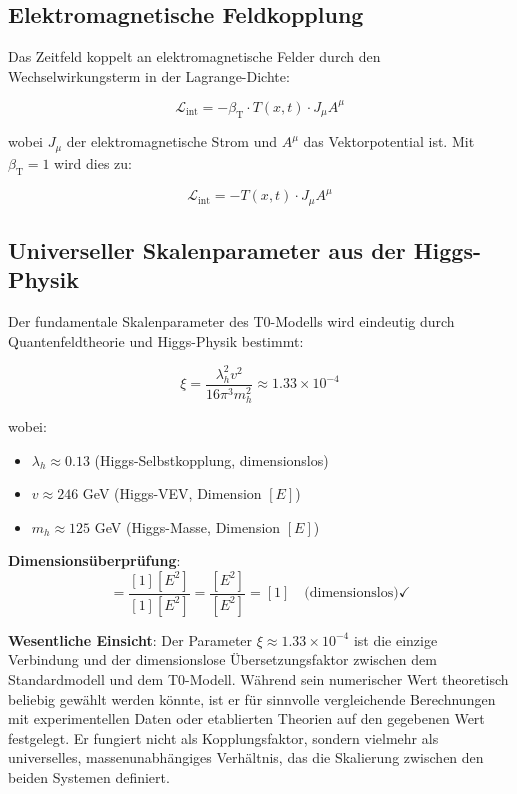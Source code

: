 \documentclass[12pt,a4paper]{article}
\newcommand{\Tfieldt}{T(x,t)}
\newcommand{\betaT}{\beta_{\text{T}}}
\newcommand{\xipar}{\xi}
\begin{document}
	\subsection{Elektromagnetische Feldkopplung}
	\label{subsec:em_coupling}
	
	Das Zeitfeld koppelt an elektromagnetische Felder durch den Wechselwirkungsterm in der Lagrange-Dichte:
	
	\begin{equation}
		\mathcal{L}_{\text{int}} = -\betaT \cdot \Tfieldt \cdot J_{\mu} A^{\mu}
	\end{equation}
	
	wobei $J_{\mu}$ der elektromagnetische Strom und $A^{\mu}$ das Vektorpotential ist. Mit $\betaT = 1$ wird dies zu:
	
	\begin{equation}
		\mathcal{L}_{\text{int}} = -\Tfieldt \cdot J_{\mu} A^{\mu}
	\end{equation}
	
	\subsection{Universeller Skalenparameter aus der Higgs-Physik}
	\label{subsec:universal_scale_parameter}
	
	Der fundamentale Skalenparameter des T0-Modells wird eindeutig durch Quantenfeldtheorie und Higgs-Physik bestimmt:
	
	\begin{equation}
		\boxed{\xipar = \frac{\lambda_h^2 v^2}{16\pi^3 m_h^2} \approx 1.33 \times 10^{-4}}
		\label{eq:xi_higgs_universal}
	\end{equation}
	
	wobei:
	\begin{itemize}
		\item $\lambda_h \approx 0.13$ (Higgs-Selbstkopplung, dimensionslos)
		\item $v \approx 246$ GeV (Higgs-VEV, Dimension $[E]$)
		\item $m_h \approx 125$ GeV (Higgs-Masse, Dimension $[E]$)
	\end{itemize}
	
	\textbf{Dimensionsüberprüfung}:
	\begin{equation}
		[\xipar] = \frac{[1][E^2]}{[1][E^2]} = \frac{[E^2]}{[E^2]} = [1] \quad \text{(dimensionslos)} \checkmark
	\end{equation}
	
	\begin{tcolorbox}[colback=green!5!white,colframe=green!75!black,title=Universeller Skalenparameter]
		\textbf{Wesentliche Einsicht}: Der Parameter $\xipar \approx 1.33 \times 10^{-4}$ ist die einzige Verbindung und der dimensionslose Übersetzungsfaktor zwischen dem Standardmodell und dem T0-Modell. Während sein numerischer Wert theoretisch beliebig gewählt werden könnte, ist er für sinnvolle vergleichende Berechnungen mit experimentellen Daten oder etablierten Theorien auf den gegebenen Wert festgelegt. Er fungiert nicht als Kopplungsfaktor, sondern vielmehr als universelles, massenunabhängiges Verhältnis, das die Skalierung zwischen den beiden Systemen definiert.
	\end{tcolorbox}
	
\end{document}

